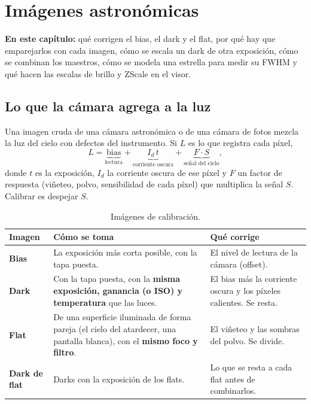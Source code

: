\chapter{Imágenes astronómicas}\label{cap:imagenes_teoria}

\begin{resumen}
\textbf{En este capítulo:} qué corrigen el bias, el dark y el flat, por qué hay que emparejarlos con cada imagen, cómo se
escala un dark de otra exposición, cómo se combinan los maestros, cómo se modela una estrella para medir su FWHM y qué
hacen las escalas de brillo y ZScale en el visor.
\end{resumen}

\section{Lo que la cámara agrega a la luz}

Una imagen cruda de una cámara astronómica o de una cámara de fotos mezcla la luz del cielo con defectos del instrumento.
Si $L$ es lo que registra cada píxel,
\begin{equation}
L = \underbrace{\text{bias}}_{\text{lectura}} + \underbrace{I_d\,t}_{\text{corriente oscura}}
  + \underbrace{F \cdot S}_{\text{señal del cielo}} ,
\end{equation}
donde $t$ es la exposición, $I_d$ la corriente oscura de ese píxel y $F$ un factor de respuesta (viñeteo, polvo, sensibilidad
de cada píxel) que multiplica la señal $S$. Calibrar es despejar $S$.

\begin{table}[H]
\centering\small
\begin{tabularx}{\linewidth}{@{}l Y Y@{}}
\toprule
Imagen & Cómo se toma & Qué corrige\\
\midrule
\textbf{Bias} & La exposición más corta posible, con la tapa puesta. & El nivel de lectura de la cámara (offset).\\
\textbf{Dark} & Con la tapa puesta, con la \textbf{misma exposición, ganancia (o ISO) y temperatura} que las luces. & El
bias más la corriente oscura y los píxeles calientes. Se resta.\\
\textbf{Flat} & De una superficie iluminada de forma pareja (el cielo del atardecer, una pantalla blanca), con el
\textbf{mismo foco y filtro}. & El viñeteo y las sombras del polvo. Se divide.\\
\textbf{Dark de flat} & Darks con la exposición de los flats. & Lo que se resta a cada flat antes de combinarlos.\\
\bottomrule
\end{tabularx}
\caption{Imágenes de calibración.}
\end{table}

